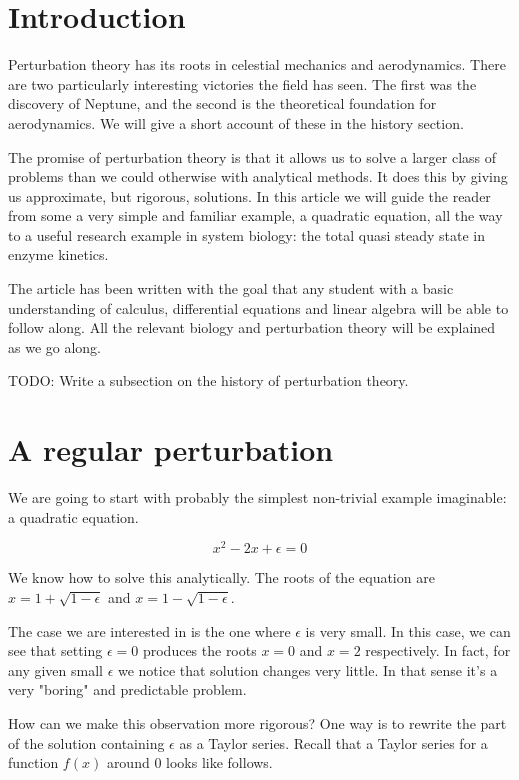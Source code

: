 \documentclass[12pt]{article}
\begin{document}
\section{Introduction}

Perturbation theory has its roots in celestial mechanics and aerodynamics. There
are two particularly interesting victories the field has seen. The first was the
discovery of Neptune, and the second is the theoretical foundation for
aerodynamics. We will give a short account of these in the history section.

The promise of perturbation theory is that it allows us to solve a
larger class of problems than we could otherwise with analytical methods. It
does this by giving us approximate, but rigorous, solutions. In this article we
will guide the reader from some a very simple and familiar example, a quadratic
equation, all the way to a useful research example in system biology: the total
quasi steady state in enzyme kinetics.

The article has been written with the goal that any student with a basic
understanding of calculus, differential equations and linear algebra will be
able to follow along. All the relevant biology and perturbation theory will be
explained as we go along.

TODO: Write a subsection on the history of perturbation theory.

\section{A regular perturbation}

We are going to start with probably the simplest non-trivial example imaginable:
a quadratic equation.

\begin{equation}
x^2 - 2x + \epsilon = 0
\end{equation}

We know how to solve this analytically. The roots of the equation are $x = 1 +
\sqrt{1 - \epsilon}$ and $x = 1 - \sqrt{1 - \epsilon}$.

The case we are interested in is the one where $\epsilon$ is very small. In this
case, we can see that setting $\epsilon=0$ produces the roots $x=0$ and $x=2$
respectively. In fact, for any given small $\epsilon$ we notice that solution
changes very little. In that sense it's a very "boring" and predictable problem.

How can we make this observation more rigorous? One way is to rewrite the part
of the solution containing $\epsilon$ as a Taylor series. Recall that a Taylor
series for a function $f(x)$ around 0 looks like follows.
\end{document}
